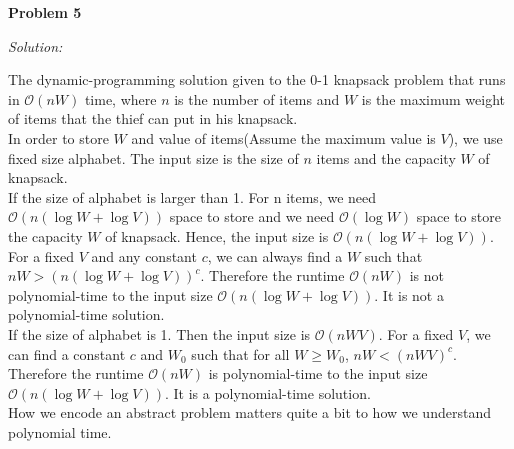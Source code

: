 \documentclass[12pt,letterpaper]{article}
\def\pp{\par\noindent}
\newcommand{\problem}[1]{ \bigskip \pp \textbf{Problem #1}\par}
\newcommand{\solution}{\textit{Solution:}\par}
\begin{document}
\problem{5}
\solution
The dynamic-programming solution given to the 0-1 knapsack problem that runs in $\mathcal{O}(nW)$ time,
where $n$ is the number of items and $W$ is the maximum weight of items that the thief can put in his knapsack. \\
In order to store $W$ and value of items(Assume the maximum value is $V$), we use fixed size alphabet.
The input size is the size of $n$ items and the capacity $W$ of knapsack. \\
If the size of alphabet is larger than 1.
For n items, we need $\mathcal{O}(n(\log W + \log V))$
space to store and we need $\mathcal{O}(\log W)$ space to store the capacity $W$ of knapsack.
Hence, the input size is $\mathcal{O}(n(\log W + \log V))$.
For a fixed $V$ and any constant $c$, we can always find a $W$ such that $nW > (n (\log W + \log V))^{c}$.
Therefore the runtime $\mathcal{O}(nW)$ is not polynomial-time to the input size $\mathcal{O}(n (\log W + \log V))$.
It is not a polynomial-time solution. \\
If the size of alphabet is 1.
Then the input size is $\mathcal{O}(nWV)$.
For a fixed $V$, we can find a constant $c$ and $W_0$ such that for all $W \ge W_0$, $nW < (nWV)^c$.
Therefore the runtime $\mathcal{O}(nW)$ is polynomial-time to the input size $\mathcal{O}(n (\log W + \log V))$.
It is a polynomial-time solution. \\
How we encode an abstract problem matters quite a bit to how we understand polynomial time.
\end{document}
